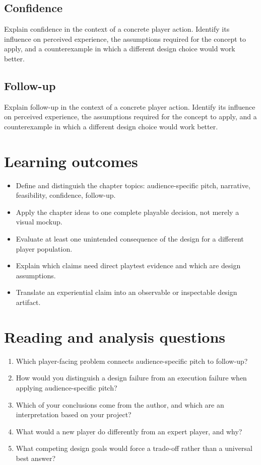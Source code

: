 \documentclass[11pt]{article}
\begin{document}
\subsection{Confidence}
Explain confidence in the context of a concrete player action. Identify its influence on perceived experience, the assumptions required for the concept to apply, and a counterexample in which a different design choice would work better.


\subsection{Follow-up}
Explain follow-up in the context of a concrete player action. Identify its influence on perceived experience, the assumptions required for the concept to apply, and a counterexample in which a different design choice would work better.


\section{Learning outcomes}
\begin{itemize}
\item Define and distinguish the chapter topics: audience-specific pitch, narrative, feasibility, confidence, follow-up.
\item Apply the chapter ideas to one complete playable decision, not merely a visual mockup.
\item Evaluate at least one unintended consequence of the design for a different player population.
\item Explain which claims need direct playtest evidence and which are design assumptions.
\item Translate an experiential claim into an observable or inspectable design artifact.
\end{itemize}

\section{Reading and analysis questions}
\begin{enumerate}
\item Which player-facing problem connects audience-specific pitch to follow-up?
\item How would you distinguish a design failure from an execution failure when applying audience-specific pitch?
\item Which of your conclusions come from the author, and which are an interpretation based on your project?
\item What would a new player do differently from an expert player, and why?
\item What competing design goals would force a trade-off rather than a universal best answer?
\end{enumerate}
\end{document}
